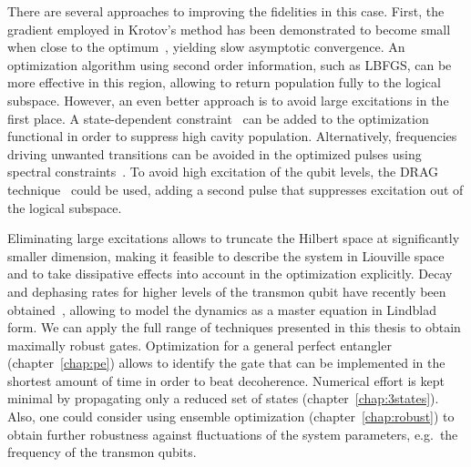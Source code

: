 There are several approaches to improving the fidelities in this case.
First, the gradient employed in Krotov's method has been demonstrated to
become small when close to the optimum~\cite{MachnesPRA2011}, yielding slow
asymptotic convergence. An optimization algorithm using second order
information, such as LBFGS, can be more effective in this region, allowing to
return population fully to the logical subspace. However, an even better
approach is to avoid large excitations in the first place.
A state-dependent constraint~\cite{PalaoPRA08} can be added to the optimization
functional in order to suppress high cavity population. Alternatively,
frequencies driving unwanted transitions can be avoided in the optimized pulses
using spectral constraints~\cite{JosePRA13, ReichJMO2014}. To avoid high
excitation of the qubit levels, the DRAG technique~\cite{MotzoiPRL2009,
MotzoiPRL2009} could be used, adding a second pulse that suppresses excitation
out of the logical subspace.

Eliminating large excitations allows to truncate the Hilbert space at
significantly smaller dimension, making it feasible to describe the
system in Liouville space and to take dissipative effects into account in the
optimization explicitly. Decay and dephasing rates for higher levels of the
transmon qubit have recently been obtained~\cite{PetererPRL2015}, allowing to
model the dynamics as a master equation in Lindblad form.
We can apply the full range of techniques presented in this thesis to obtain
maximally robust gates. Optimization for a general perfect entangler
(chapter~\ref{chap:pe}) allows to identify the gate that can be implemented in
the shortest amount of time in order to beat decoherence. Numerical effort is
kept minimal by propagating only a reduced set of states
(chapter~\ref{chap:3states}).  Also, one could consider using ensemble
optimization (chapter~\ref{chap:robust}) to obtain further robustness against
fluctuations of the system parameters, e.g.\ the frequency of the transmon
qubits.


